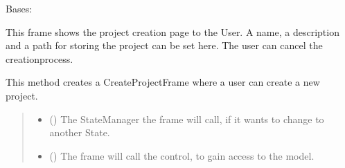 \documentclass[letterpaper,10pt,english]{sphinxmanual}
\begin{document}
\begin{fulllineitems}
\label{\detokenize{apidoc/src.osm_configurator.view.toplevelframes:src.osm_configurator.view.toplevelframes.create_project_frame.CreateProjectFrame}}
\pysigstartsignatures
{}
\pysigstopsignatures
\sphinxAtStartPar
Bases: {\hyperref[\detokenize{apidoc/src.osm_configurator.view.toplevelframes:src.osm_configurator.view.toplevelframes.top_level_frame.TopLevelFrame}]{}}

\sphinxAtStartPar
This frame shows the project creation page to the User.
A name, a description and a path for storing the project can be set here.
The user can cancel the creation\sphinxhyphen{}process.

\begin{fulllineitems}
\label{\detokenize{apidoc/src.osm_configurator.view.toplevelframes:src.osm_configurator.view.toplevelframes.create_project_frame.CreateProjectFrame.__init__}}
\pysigstartsignatures
{}
\pysigstopsignatures
\sphinxAtStartPar
This method creates a CreateProjectFrame where a user can create a new project.
\begin{quote}\begin{description}
\begin{itemize}
\item {} 
\sphinxAtStartPar
{} ({\hyperref[\detokenize{apidoc/src.osm_configurator.view.states:src.osm_configurator.view.states.state_manager.StateManager}]{}}) \textendash{} The StateManager the frame will call, if it wants to change to another State.

\item {} 
\sphinxAtStartPar
{} ({\hyperref[\detokenize{apidoc/src.osm_configurator.control:src.osm_configurator.control.control_interface.IControl}]{}}) \textendash{} The frame will call the control, to gain access to the model.


\end{itemize}
\end{description}
\end{quote}
\end{fulllineitems}
\end{fulllineitems}
\end{document}
